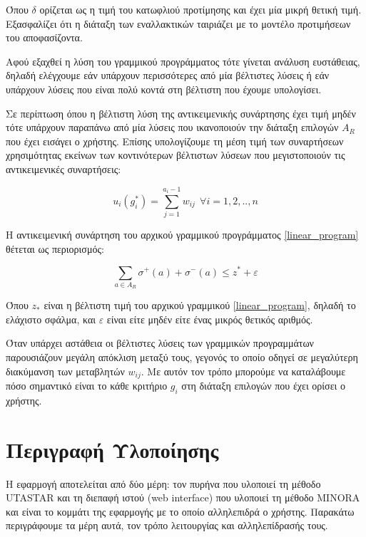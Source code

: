 \documentclass[11pt,a4paper,titlepage]{article}
\numberwithin{equation}{section}
\begin{document}
\newpage

Όπου $δ$ ορίζεται ως η τιμή του κατωφλιού προτίμησης και έχει μία μικρή θετική τιμή. Εξασφαλίζει ότι η διάταξη των εναλλακτικών ταιριάζει με το μοντέλο προτιμήσεων του αποφασίζοντα.

Αφού εξαχθεί η λύση του γραμμικού προγράμματος τότε γίνεται ανάλυση ευστάθειας, δηλαδή ελέγχουμε εάν υπάρχουν περισσότερες από μία βέλτιστες λύσεις ή εάν υπάρχουν λύσεις που είναι πολύ κοντά στη βέλτιστη που έχουμε υπολογίσει.

Σε περίπτωση όπου η βέλτιστη λύση της αντικειμενικής συνάρτησης έχει τιμή μηδέν τότε υπάρχουν παραπάνω από μία λύσεις που ικανοποιούν την διάταξη επιλογών $A_{R}$ που έχει εισάγει ο χρήστης. Επίσης υπολογίζουμε τη μέση τιμή των συναρτήσεων χρησιμότητας εκείνων των κοντινότερων βέλτιστων λύσεων που μεγιστοποιούν τις αντικειμενικές συναρτήσεις:

\begin{equation}
	u_{i}(g_{i}^{*}) = \sum_{j=1}^{a_{i}-1} w_{ij}  ~~\forall i=1,2,..,n
\end{equation} 

Η αντικειμενική συνάρτηση του αρχικού γραμμικού προγράμματος \ref{linear_program} θέτεται ως περιορισμός:

\begin{equation}
	\sum_{a\in A_{R}} {σ^{+}(a) + σ^{-}(a)} \leq z^{*} + ε
\end{equation}

Όπου $z_{*}$ είναι η βέλτιστη τιμή του αρχικού γραμμικού \ref{linear_program}, δηλαδή το ελάχιστο σφάλμα, και $ε$ είναι είτε μηδέν είτε ένας μικρός θετικός αριθμός. 

Όταν υπάρχει αστάθεια οι βέλτιστες λύσεις των γραμμικών προγραμμάτων παρουσιάζουν μεγάλη απόκλιση μεταξύ τους, γεγονός το οποίο οδηγεί σε μεγαλύτερη διακύμανση των μεταβλητών $w_{ij}$. Με αυτόν τον τρόπο μπορούμε να καταλάβουμε πόσο σημαντικό είναι το κάθε κριτήριο $g_{i}$ στη διάταξη επιλογών που έχει ορίσει ο χρήστης.

\section{Περιγραφή Υλοποίησης}
\label{sec:implementation}
Η εφαρμογή αποτελείται από δύο μέρη: τον πυρήνα που υλοποιεί τη μέθοδο UTASTAR και τη διεπαφή ιστού (web interface) που υλοποιεί τη μέθοδο MINORA και είναι το κομμάτι της εφαρμογής με το οποίο αλληλεπιδρά ο χρήστης. Παρακάτω περιγράφουμε τα μέρη αυτά, τον τρόπο λειτουργίας και αλληλεπίδρασής τους.
\end{document}
